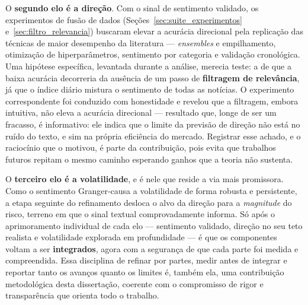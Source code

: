 O \textbf{segundo elo é a direção}. Com o sinal de sentimento validado, os experimentos de fusão de
dados (Seções~\ref{sec:suite_experimentos} e~\ref{sec:filtro_relevancia}) buscaram elevar a acurácia
direcional pela replicação das técnicas de maior desempenho da literatura --- \textit{ensembles} e
empilhamento, otimização de hiperparâmetros, sentimento por categoria e validação cronológica. Uma
hipótese específica, levantada durante a análise, merecia teste: a de que a baixa acurácia decorreria
da ausência de um passo de \textbf{filtragem de relevância}, já que o índice diário mistura o
sentimento de todas as notícias. O experimento correspondente foi conduzido com honestidade e revelou
que a filtragem, embora intuitiva, não eleva a acurácia direcional --- resultado que, longe de ser um
fracasso, é informativo: ele indica que o limite da previsão de direção não está no ruído do texto, e
sim na própria eficiência do mercado. Registrar esse achado, e o raciocínio que o motivou, é parte da
contribuição, pois evita que trabalhos futuros repitam o mesmo caminho esperando ganhos que a teoria
não sustenta.

O \textbf{terceiro elo é a volatilidade}, e é nele que reside a via mais promissora. Como o sentimento
Granger-causa a volatilidade de forma robusta e persistente, a etapa seguinte do refinamento desloca o
alvo da direção para a \emph{magnitude} do risco, terreno em que o sinal textual comprovadamente
informa. Só após o aprimoramento individual de cada elo --- sentimento validado, direção no seu teto
realista e volatilidade explorada em profundidade --- é que os componentes voltam a ser
\textbf{integrados}, agora com a segurança de que cada parte foi medida e compreendida. Essa disciplina
de refinar por partes, medir antes de integrar e reportar tanto os avanços quanto os limites é,
também ela, uma contribuição metodológica desta dissertação, coerente com o compromisso de rigor e
transparência que orienta todo o trabalho.
